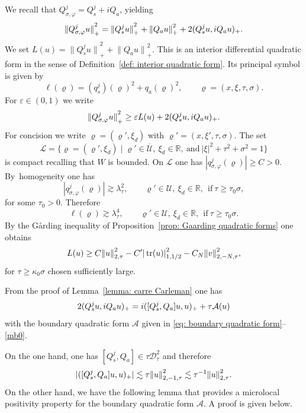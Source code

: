 \documentclass[10pt]{amsart}
\let\sep\mid
\theoremstyle{plain}
\theoremstyle{definition}
\def\R{\mathbb{R}}
\newcommand{\suff}{sufficiently\xspace}
\let\k\kappa
\let\y\varrho
\let \Re \relax
\DeclareMathOperator{\Re}{Re}
\newcommand{\ovl}[1]{\overline{#1}}
\newcommand{\inp}[2]{(#1, #2)}
\newcommand{\U}{\mathscr U}
\newcommand{\Norm}[2]{{\| #1 \|}_{#2}}
\newcommand{\norm}[2]{{|#1|}_{#2}}
\newcommand{\Normsc}[2]{{\| #1 \|}_{#2, \tau}}
\newcommand{\lsc}{\lambda_\tau}
\newcommand{\Dsc}{\mathscr{D}_{\tau}}
\newcommand{\Qconj}{Q_{\sigma,\varphi}}
\newcommand{\qconj}{q_{\sigma,\varphi}}
\newcommand{\Qs}{Q_{s}}
\newcommand{\Qa}{Q_{a}}
\DeclareMathOperator{\trace}{tr}
\begin{document}
We recall that $\Qconj^j=\Qs^j+i\Qa$, yielding
\begin{equation*}
\Norm{\Qconj^j u}{+}^2
=\Norm{\Qs^j u}{+}^2 +\Norm{\Qa u}{+}^2
+2\Re \inp{\Qs^ju}{i\Qa u}_+.
\end{equation*}
We set $L(u)=\Norm{\Qs^ju}{+}^2+\Norm{\Qa u}{+}^2$.
This is an interior differential quadratic form in the sense of Definition~\ref{def: interior quadratic form}. Its principal symbol is given by
\begin{equation*}
\ell(\y)=(q^j_s)(\y)^2+q_a(\y)^2, \qquad \y= (x,\xi,\tau,\sigma).
\end{equation*}
For $\varepsilon\in (0,1)$ we write
\begin{equation}\label{mb1}
\Norm{\Qconj^ju}{+}^2\geq \varepsilon L(u)
+ 2\Re \inp{\Qs^ju}{i\Qa u}_+.
\end{equation}
For concision we write $\y = (\y',\xi_d)$ with $\y' = (x,\xi',\tau,\sigma)$.
The set
\begin{equation*}
\mathscr{L}
=\{\y = (\y',\xi_d)\sep \y' \in \ovl{\U},\
\xi_d\in\R, \ \text{and}\ |\xi|^2+\tau^2+\sigma^2=1\}
\end{equation*}
is compact recalling that $W$ is bounded.
On $\mathscr{L}$ one has $|\qconj^j(\y)|\geq C>0$. By~homo\-geneity one has
\begin{equation}\label{mb2}
|\qconj^j(\y)|\gtrsim \lsc^2, \qquad
\y' \in \U, \ \xi_d \in \R, \ \ \text{if} \ \tau \geq \tau_0 \sigma,
\end{equation}
for some $\tau_0>0$.
Therefore
\begin{equation}\label{mb3}
\ell(\y) \gtrsim \lsc^4,
\qquad \y' \in \U, \ \xi_d \in \R, \ \ \text{if} \ \tau \geq \tau_0 \sigma.
\end{equation}
By the G\aa rding inequality of Proposition~\ref{prop: Gaarding quadratic forms} one obtains
\begin{equation}
\label{mb4}
\Re L(u)\geq
C\Normsc{u}{2}^2-C' \norm{\trace(u)}{1,1/2}^2-C_N\Normsc{v}{2,-N}^2,
\end{equation}
for $\tau\geq \k_0\sigma$ chosen \suff
large.

From the proof of Lemma~\ref{lemma: carre Carleman} one has
\begin{equation}
\label{eq: lemma: carre Carleman}
2\Re \inp{\Qs^ju}{i\Qa u}_+
= i \inp{[\Qs^j,\Qa]u}{u}_+
+\tau\mathcal{A}(u)
\end{equation}
with the boundary quadratic form $\mathcal{A}$ given in \eqref{eq:
boundary quadratic form}--\eqref{mb0}.

On the one hand, one has $[\Qs^j,\Qa]\in\tau\Dsc^2$ and therefore
\begin{equation}\label{mb5}
|\Re \inp{[\Qs^j,\Qa]u}{u}_+|
\lesssim \tau \Normsc{u}{2,-1}^2
\lesssim \tau^{-1}\Normsc{u}{2}^2.
\end{equation}
On the other hand, we have the following lemma that provides a
microlocal positivity property for the boundary quadratic form $\mathcal{A}$. A proof is given
below.
\end{document}
